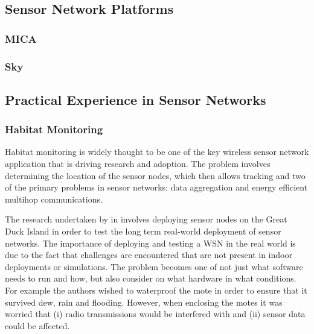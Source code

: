 \subsection{Sensor Network Platforms}

\subsubsection*{MICA}
\cite{Mica2002}

\subsubsection*{Sky}


\subsection{Practical Experience in Sensor Networks}
\label{sec:lit-review-practical-experience}

\subsubsection*{Habitat Monitoring}

Habitat monitoring is widely thought to be one of the key wireless sensor network application that is driving research and adoption. The problem involves determining the location of the sensor nodes, which then allows tracking \cite{Cerpa:2001:HMA:844193.844196} and two of the primary problems in sensor networks: data aggregation and energy efficient multihop communications.

The research undertaken by \citeauthor{SzewczykPMC04} in \cite{SzewczykPMC04} involves deploying sensor nodes on the Great Duck Island in order to test the long term real-world deployment of sensor networks. The importance of deploying and testing a WSN in the real world is due to the fact that challenges are encountered that are not present in indoor deployments or simulations. The problem becomes one of not just what software needs to run and how, but also consider on what hardware in what conditions. For example the authors wished to waterproof the mote in order to ensure that it survived dew, rain and flooding. However, when enclosing the motes it was worried that (i) radio transmissions would be interfered with and (ii) sensor data could be affected.

